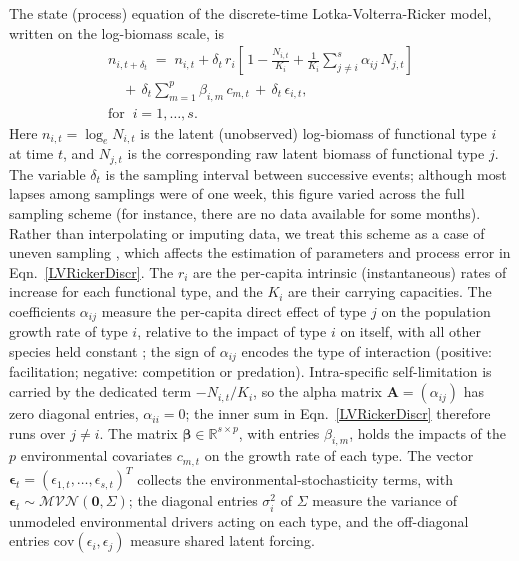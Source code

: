 \documentclass[12pt]{article}
\newcommand{\R}{\mathbb{R}}
\begin{document}
The state (process) equation of the discrete-time Lotka-Volterra-Ricker model, written on the log-biomass scale, is
\begin{equation}\label{LVRickerDiscr}
	\begin{split}
		n_{i,t+\delta_{t}} \;=\; n_{i,t} + \delta_{t}\, r_{i}\!\left[\,1 - \frac{N_{i,t}}{K_{i}} + \frac{1}{K_{i}}\sum_{j\neq i}^{s}\alpha_{ij}\,N_{j,t}\right] \\
		\quad+\, \delta_{t}\sum_{m=1}^{p}\beta_{i,m}\,c_{m,t} \,+\, \delta_{t}\,\epsilon_{i,t}, \\
		\text{for}\;\; i=1,\ldots,s.
	\end{split}
\end{equation}
Here $n_{i,t}=\log_{e}N_{i,t}$ is the latent (unobserved) log-biomass of functional type $i$ at time $t$, and $N_{j,t}$ is the corresponding raw latent biomass of functional type $j$. The variable $\delta_{t}$ is the sampling interval between successive events; although most lapses among samplings were of one week, this figure varied across the full sampling scheme (for instance, there are no data available for some months). Rather than interpolating or imputing data, we treat this scheme as a case of uneven sampling \citep{Clark2004,Clark2007}, which affects the estimation of parameters and process error in Eqn.~\ref{LVRickerDiscr}. The $r_{i}$ are the per-capita intrinsic (instantaneous) rates of increase for each functional type, and the $K_{i}$ are their carrying capacities. The coefficients $\alpha_{ij}$ measure the per-capita direct effect of type $j$ on the population growth rate of type $i$, relative to the impact of type $i$ on itself, with all other species held constant \citep{Levins1968,Novak2016}; the sign of $\alpha_{ij}$ encodes the type of interaction (positive: facilitation; negative: competition or predation). Intra-specific self-limitation is carried by the dedicated term $-N_{i,t}/K_{i}$, so the alpha matrix $\mathbf{A}=(\alpha_{ij})$ has zero diagonal entries, $\alpha_{ii}=0$; the inner sum in Eqn.~\ref{LVRickerDiscr} therefore runs over $j\neq i$. The matrix $\boldsymbol{\beta}\in\R^{s\times p}$, with entries $\beta_{i,m}$, holds the impacts of the $p$ environmental covariates $c_{m,t}$ on the growth rate of each type. The vector $\boldsymbol{\epsilon}_{t}=(\epsilon_{1,t},\ldots,\epsilon_{s,t})^{T}$ collects the environmental-stochasticity terms, with $\boldsymbol{\epsilon}_{t}\sim\mathcal{MVN}(\mathbf{0},\Sigma)$; the diagonal entries $\sigma_{i}^{2}$ of $\Sigma$ measure the variance of unmodeled environmental drivers acting on each type, and the off-diagonal entries $\mathrm{cov}(\epsilon_{i},\epsilon_{j})$ measure shared latent forcing.
\end{document}
